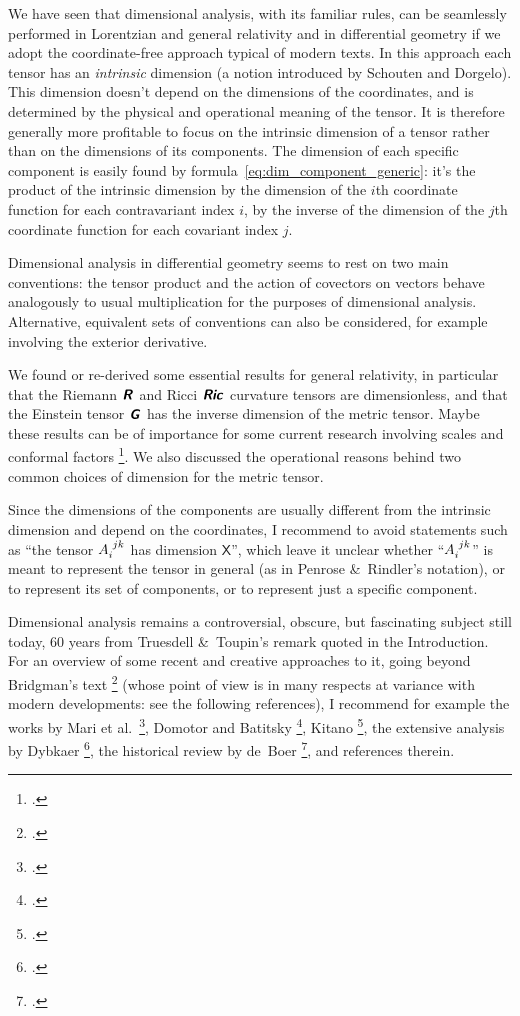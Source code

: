 \documentclass[a4paper,12pt,onecolumn,oneside,article,british]{memoir}
\makeatletter
\newcommand*{\mathte}[1]{\textbf{\textit{\textsf{#1}}}}
\newcommand*{\citep}{\footcites}
\newcommand*{\amp}{\&}
\newcommand*{\eg}{{e.g.}}
\newcommand*{\etal}{{et al.}}
\newcommand*{\q}{}%
\DeclareRobustCommand*{\q}{%
  \mathbin{\mathpalette\bigcdot@{}}%
}
\newcommand*{\bigcdot@scalefactor}{0.7}
\newcommand*{\bigcdot@widthfactor}{1.5}
\newcommand*{\bigcdot@}[2]{%
  \sbox0{$#1\vcenter{}$}%
  \sbox2{$#1\cdot\m@th$}%
  \hbox to \bigcdot@widthfactor\wd2{%
    \hfil
    \raise\ht0\hbox{%
      \scalebox{\bigcdot@scalefactor}{%
        \lower\ht0\hbox{$#1\bullet\m@th$}%
      }%
    }%
    \hfil
  }%
}
\newcommand*{\Xx}{\textsf{X}}
\newcommand*{\yG}{\mathte{G}}
\newcommand*{\yR}{\mathte{R}}
\newcommand*{\yRi}{\mathte{Ric}}
\renewcommand*{\i}{\indices}
\makeatother
\begin{document}
We have seen that dimensional analysis, with its familiar rules, can be
seamlessly performed in Lorentzian and general relativity and in
differential geometry if we adopt the coordinate-free approach typical of
modern texts. In this approach each tensor has an \emph{intrinsic}
dimension (a notion introduced by Schouten and Dorgelo). This dimension
doesn't depend on the dimensions of the coordinates, and is determined by
the physical and operational meaning of the tensor. It is therefore
generally more profitable to focus on the intrinsic dimension of a tensor
rather than on the dimensions of its components. The dimension of each
specific component is easily found by
formula~\eqref{eq:dim_component_generic}: it's the product of the intrinsic
dimension by the dimension of the $i$th coordinate function for each
contravariant index $i$, by the inverse of the dimension of the $j$th
coordinate function for each covariant index $j$.

Dimensional analysis in differential geometry seems to rest on two main
conventions: the tensor product and the action of covectors on vectors
behave analogously to usual multiplication for the purposes of dimensional
analysis. Alternative, equivalent sets of conventions can also be
considered, for example involving the exterior derivative.

We found or re-derived some essential results for general relativity, in
particular that the Riemann $\yR\i{^{\q}_{\q\q\q}}$ and Ricci
$\yRi\i{_{\q\q}}$ curvature tensors are dimensionless, and that the
Einstein tensor $\yG\i{_{\q}^{\q}}$ has the inverse dimension of the metric
tensor. Maybe these results can be of importance for some current research
involving scales and conformal factors
\citep[\eg][]{roehretal2005,cadonietal2019}. We also discussed the
operational reasons behind two common choices of dimension for the metric
tensor.

Since the dimensions of the components are usually different from the
intrinsic dimension and depend on the coordinates, I recommend to avoid
statements such as \enquote{the tensor $A\i{_{i}^{jk}}$ has dimension
  $\Xx$}, which leave it unclear whether \enquote{$A\i{_{i}^{jk}}$} is
meant to represent the tensor in general (as in Penrose \amp\ Rindler's
notation), or to represent its set of components, or to represent just a
specific component.

\medskip

Dimensional analysis remains a controversial, obscure, but fascinating
subject still today, 60 years from Truesdell \amp\ Toupin's remark quoted
in the Introduction. For an overview of some recent and creative approaches
to it, going beyond Bridgman's text \citep{bridgman1922_r1963} (whose point
of view is in many respects at variance with modern developments: see the
following references), I recommend for example the works by Mari \etal\
\citep{marietal2012,frigerioetal2010}, Domotor and Batitsky
\citep{domotor2017,domotoretal2016,domotor2012}, Kitano \citep{kitano2013},
the extensive analysis by Dybkaer \citep{dybkaer2004_r2010}, the historical
review by de~Boer \citep{deboer1995}, and references therein.
\end{document}
